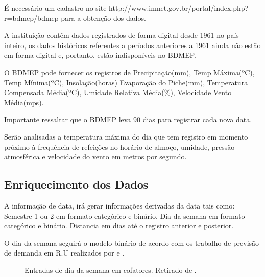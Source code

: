 \documentclass[	12pt, Times, openright, twoside, a4paper, english, brazil]{abntex2}
\begin{document}
    	É necessário um cadastro no site http://www.inmet.gov.br/portal/index.php?r=bdmep/bdmep para a obtenção dos dados. 
    	
    	A instituição contêm dados registrados de forma digital desde 1961 no país inteiro, os dados históricos referentes a períodos anteriores a 1961 ainda não estão em forma digital e, portanto, estão indisponíveis no BDMEP.
    	
    	O BDMEP pode fornecer os registros de Precipitação(mm), Temp Máxima(ºC), Temp Mínima(ºC), Insolação(horas)
    	Evaporação do Piche(mm), Temperatura Compensada Média(ºC), Umidade Relativa Média(\%), Velocidade Vento Média(mps).
    	
    	Importante ressaltar que o BDMEP leva 90 dias para registrar cada nova data.
    	
    	Serão analisadas a temperatura máxima do dia que tem registro em momento próximo à frequência de refeições no horário de almoço, umidade, pressão atmosférica e velocidade do vento em metros por segundo.
    	
    	\subsection{Enriquecimento dos Dados}
    	
    	A informação de data, irá gerar informações derivadas da data tais como: 
    	Semestre 1 ou 2 em formato categórico e binário.
    	Dia da semana em formato categórico e binário.
    	Distancia em dias até o registro anterior e posterior.
    	
    	 
    	O dia da semana seguirá o modelo binário de acordo com os trabalho de previsão de demanda em R.U realizados por \cite{Lopes2008} e \cite{Rocha2011}.
	
	\begin{figure}[!ht]
		\caption{Entradas de dia da semana em cofatores. Retirado de \cite{Lopes2008}.\label{fig:entradasSemanais}}
	\end{figure}
	
\end{document}
